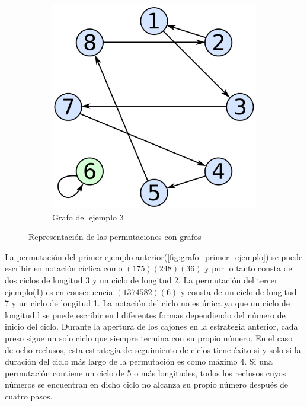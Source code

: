 \begin{figure}[H]
\begin{subfigure}{0.49\textwidth}
     \includegraphics[width=\textwidth]{imagenes/Permutation_cycles_qtl2.png}
     \caption{Grafo del ejemplo 3}
     \label{fig:grafo_tercer_ejemplo}
 \end{subfigure}

 \caption{Representación de las permutaciones con grafos}
 \label{fig:grafos}

\end{figure}

La permutación del primer ejemplo anterior(\ref{fig:grafo_primer_ejemplo}) se puede escribir en notación cíclica como $(1 7 5)(2 4 8)(3 6)$ y por lo tanto consta de dos ciclos de longitud 3 y un ciclo de longitud 2. La permutación del tercer ejemplo(\ref{fig:grafo_tercer_ejemplo}) es en consecuencia
$(1 3 7 4 5 8 2)(6)$ y consta de un ciclo de longitud 7 y un ciclo de longitud 1. La notación del ciclo no es única ya que un ciclo de longitud l se puede escribir en l diferentes formas dependiendo del número de inicio del ciclo. Durante la apertura de los cajones en la estrategia anterior, cada preso sigue un solo ciclo que siempre termina con su propio número. En el caso de ocho reclusos, esta estrategia de seguimiento de ciclos tiene éxito si y solo si la duración del ciclo más largo de la permutación es como máximo 4. Si una permutación contiene un ciclo de 5 o más longitudes, todos los reclusos cuyos números se encuentran en dicho ciclo no alcanza su propio número después de cuatro pasos.